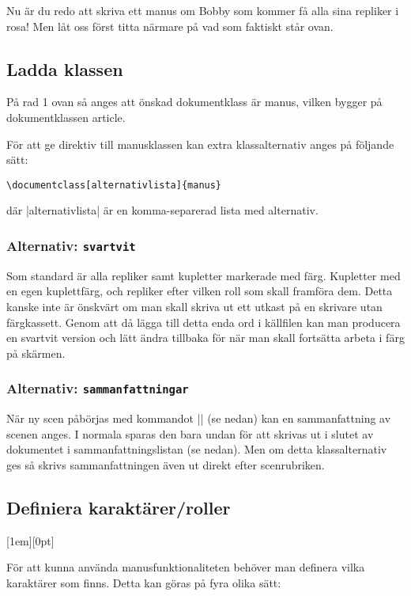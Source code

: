 \documentclass[a4paper,12pt]{article}
\newcommand*{\pack}{\textsf}
\newcommand\funnybone[1]{%
	\raisebox{1em}[1em][0pt]{%
		\makebox[\textwidth][r]{\large\it eller, ``#1''}%
	}%
}
\begin{document}
\noindent
Nu är du redo att skriva ett manus om Bobby som kommer få alla sina repliker i rosa! Men låt oss först titta närmare på vad som faktiskt står ovan.

\subsection{Ladda klassen}
På rad 1 ovan så anges att önskad dokumentklass är \pack{manus}, vilken bygger på dokumentklassen \pack{article}.

För att ge direktiv till manusklassen kan extra klassalternativ anges på följande sätt:

\begin{lstlisting}
\documentclass[alternativlista]{manus}
\end{lstlisting}

\noindent
där |alternativlista| är en komma-separerad lista med alternativ.

\subsubsection{Alternativ: \texttt{svartvit}}
\label{alt:svartvit}
Som standard är alla repliker samt kupletter markerade med färg. Kupletter med en egen kuplettfärg, och repliker efter vilken roll som skall framföra dem. Detta kanske inte är önskvärt om man skall skriva ut ett utkast på en skrivare utan färgkassett. Genom att då lägga till detta enda ord i källfilen kan man producera en svartvit version och lätt ändra tillbaka för när man skall fortsätta arbeta i färg på skärmen.

\subsubsection{Alternativ: \texttt{sammanfattningar}}
\label{alt:sammanfattningar}
När ny scen påbörjas med kommandot |\scen| (se nedan) kan en sammanfattning av scenen anges. I normala sparas den bara undan för att skrivas ut i slutet av dokumentet i sammanfattningslistan (se nedan). Men om detta klassalternativ ges så skrivs sammanfattningen även ut direkt efter scenrubriken.

\subsection{Definiera karaktärer/roller}
\funnybone{Våra tävlande är...}
\label{sec:nyroll}
För att kunna använda manusfunktionaliteten behöver man definera vilka karaktärer som finns. Detta kan göras på fyra olika sätt:
\end{document}
